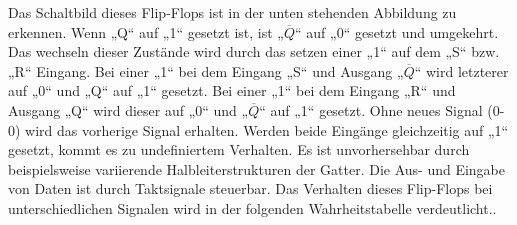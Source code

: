      \noindent
     Das Schaltbild dieses Flip-Flops ist in der unten stehenden Abbildung zu erkennen.
     Wenn „Q“ auf „1“ gesetzt ist, ist „$\overline{Q}$“ auf „0“ gesetzt und umgekehrt. 
     Das wechseln dieser Zustände wird durch das setzen einer „1“ auf dem „S“ bzw. „R“ Eingang. 
     Bei einer „1“ bei dem Eingang „S“ und Ausgang „$\overline{Q}$“ wird letzterer auf „0“ und „Q“ auf „1“ gesetzt. 
     Bei einer „1“ bei dem Eingang „R“ und Ausgang „Q“ wird dieser auf „0“ und „$\overline{Q}$“ auf „1“ gesetzt. 
     Ohne neues Signal (0-0) wird das vorherige Signal erhalten. 
     Werden beide Eingänge gleichzeitig auf „1“ gesetzt, kommt es zu undefiniertem Verhalten. 
     Es ist unvorhersehbar durch beispielsweise variierende Halbleiterstrukturen der Gatter. 
     Die Aus- und Eingabe von Daten ist durch Taktsignale steuerbar.
    Das Verhalten dieses Flip-Flops bei unterschiedlichen Signalen wird in der folgenden Wahrheitstabelle verdeutlicht..\cite{digbau}
